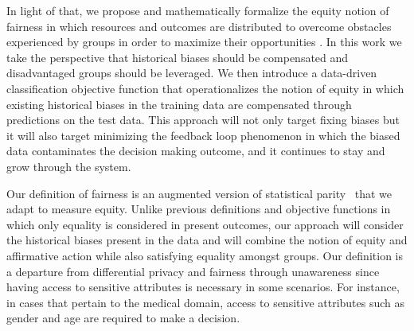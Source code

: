  In light of that, we propose and mathematically formalize the equity notion of fairness in which resources and outcomes are distributed to overcome obstacles experienced by groups in order to maximize their opportunities \cite{schement2001imagining}. In this work we take the perspective that historical biases should be compensated and disadvantaged groups should be leveraged. We then introduce a data-driven classification objective function that operationalizes the notion of equity in which existing historical biases in the training data are compensated through predictions on the test data. 
 This approach will not only target fixing biases but it will also target minimizing the feedback loop phenomenon in which the biased data contaminates the decision making outcome, and it continues to stay and grow through the system. 
 
Our definition of fairness is an augmented version of statistical parity~\cite{Dwork:2012:FTA:2090236.2090255} that we adapt to measure equity. Unlike previous definitions and objective functions in which only equality is considered in present outcomes, our approach will consider the historical biases present in the data and will combine the notion of equity and affirmative action while also satisfying equality amongst groups. Our definition is a departure from differential privacy \cite{jagielski2019differentially} and fairness through unawareness \cite{10.1145/3287560.3287594} since having access to sensitive attributes is necessary in some scenarios. For instance, in cases that pertain to the medical domain, access to sensitive attributes such as gender and age are required to make a decision.


